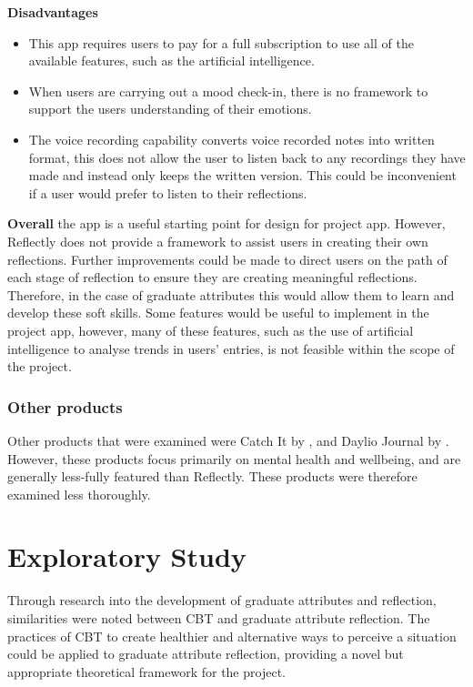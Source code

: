 \documentclass{l4proj}
\begin{document}
\textbf{Disadvantages}
\begin{itemize}
    \item This app requires users to pay for a full subscription to use all of the available features, such as the artificial intelligence. 
    \item When users are carrying out a mood check-in, there is no framework to support the users understanding of their emotions.
    \item The voice recording capability converts voice recorded notes into written format, this does not allow the user to listen back to any recordings they have made and instead only keeps the written version. This could be inconvenient if a user would prefer to listen to their reflections.
\end{itemize}

\textbf{Overall} the app is a useful starting point for design for project app. However, Reflectly does not provide a framework to assist users in creating their own reflections. Further improvements could be made to direct users on the path of each stage of reflection to ensure they are creating meaningful reflections. Therefore, in the case of graduate attributes this would allow them to learn and develop these soft skills. Some features would be useful to implement in the project app, however, many of these features, such as the use of artificial intelligence to analyse trends in users’ entries, is not feasible within the scope of the project.

\subsection{Other products}

Other products that were examined were Catch It by \citet{nhsDigital_catch_2021}, and Daylio Journal by \citet{relaxio_src_daylio_2021}. However, these products focus primarily on mental health and wellbeing, and are generally less-fully featured than Reflectly. These products were therefore examined less thoroughly.

\chapter{Exploratory Study} \label{ExploratoryStudy}

Through research into the development of graduate attributes and reflection, similarities were noted between CBT and graduate attribute reflection. The practices of CBT to create healthier and alternative ways to perceive a situation could be applied to graduate attribute reflection, providing a novel but appropriate theoretical framework for the project.
\end{document}
